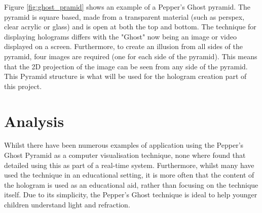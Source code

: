 Figure \ref{fig:ghost_pramid} shows an example of a Pepper's Ghost pyramid. The pyramid is square based, made from a transparent material (such as perspex, clear acrylic or glass) and is open at both the top and bottom. The technique for displaying holograms differs with the "Ghost" now being an image or video displayed on a screen. Furthermore, to create an illusion from all sides of the pyramid, four images are required (one for each side of the pyramid). This  means that the 2D projection of the image can be seen from any side of the pyramid. This Pyramid structure is what will be used for the hologram creation part of this project.

\newpage

\section{Analysis}
Whilst there have been numerous examples of application using the Pepper's Ghost Pyramid as a computer visualisation technique, none where found that detailed using this as part of a real-time system. Furthermore, whilst many have used the technique in an educational setting, it is more often that the content of the hologram is used as an educational aid, rather than focusing on the technique itself. Due to its simplicity, the Pepper's Ghost technique is ideal to help younger children understand light and refraction.  


